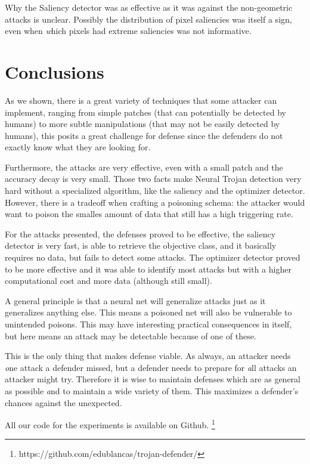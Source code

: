 \documentclass[letterpaper, 10 pt, conference]{ieeeconf}  %
\begin{document}
Why the Saliency detector was as effective as it was against the
non-geometric attacks is unclear.  Possibly the distribution of pixel
saliencies was itself a sign, even when {\textit which} pixels had
extreme saliencies was not informative.

\section{Conclusions}

As we shown, there is a great variety of techniques that some attacker can
implement, ranging from simple patches (that can potentially be detected by
humans) to more subtle manipulations (that may not be easily detected
by humans), this posits a great challenge for defense since the defenders do
not exactly know what they are looking for.

Furthermore, the attacks are very effective, even with a small patch and the
accuracy decay is very small. Those two facts make Neural Trojan detection
very hard without a specialized algorithm, like the saliency and the
optimizer detector. However, there is a tradeoff when crafting a poisoning
schema: the attacker would want to poison the smalles amount of data that still
has a high triggering rate.


For the attacks presented, the defenses proved to be effective, the saliency
detector is very fast, is able to retrieve the objective class, and it basically
requires no data, but fails to detect some attacks. The optimizer detector proved
to be more effective and it was able to identify most attacks but with a
higher computational cost and more data (although still small).

A general principle is that a neural net will generalize attacks just
as it generalizes anything else.  This means a poisoned net will also
be vulnerable to unintended poisons.  This may have interesting
practical consequences in itself, but here means an attack may be
detectable because of one of these.

This is the only thing that makes defense viable.  As always, an
attacker needs {\textit one} attack a defender missed, but a defender
needs to prepare for {\textit all} attacks an attacker might try.
Therefore it is wise to maintain defenses which are as general as
possible {\textit and} to maintain a wide variety of them.  This
maximizes a defender's chances against the unexpected.

All our code for the experiments is available on Github. \footnote{https://github.com/edublancas/trojan-defender/}
\end{document}
